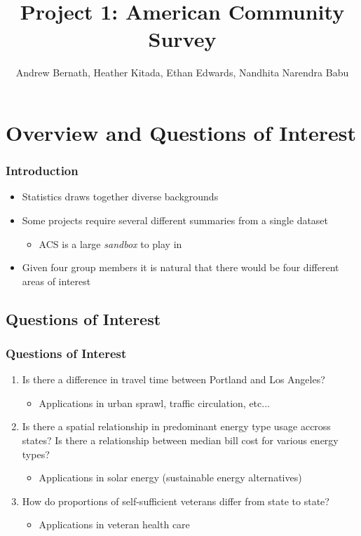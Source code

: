 \documentclass{beamer}
\title{Project 1: American Community Survey}
\author{Andrew Bernath, Heather Kitada, Ethan Edwards, Nandhita Narendra Babu}
\institute{Oregon State University}
\date
\begin{document}
\begin{frame}
\titlepage
\end{frame}

\begin{frame}{\contentsname}
\begin{multicols}{2}
\tableofcontents
\end{multicols}
\end{frame}

\section{Overview and Questions of Interest}
\begin{frame}
\frametitle{Introduction }
\begin{itemize}
\item Statistics draws together diverse backgrounds
\item Some projects require several different summaries from a single dataset
\begin{itemize}
\item ACS is a large \emph{sandbox} to play in
\end{itemize}
\item Given four group members it is natural that there would be four different areas of interest
\end{itemize}

\end{frame}

\subsection{Questions of Interest}
\begin{frame}
\frametitle{Questions of Interest }
\begin{enumerate}
\item Is there a difference in travel time between Portland and Los Angeles? 
\begin{itemize}
\item Applications in urban sprawl, traffic circulation, etc...
\end{itemize}
\item Is there a spatial relationship in predominant energy type usage accross states?  Is there a relationship between median bill cost for various energy types?
\begin{itemize}
\item Applications in solar energy (sustainable energy alternatives)
\end{itemize}
\item How do proportions of self-sufficient veterans differ from state to state?
\begin{itemize}
\item Applications in veteran health care 
\end{itemize}
\end{enumerate}
\end{frame}
\end{document}
